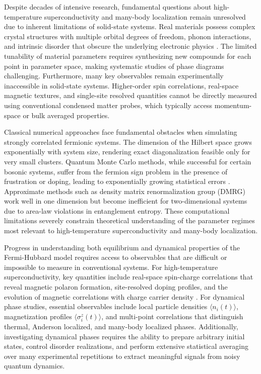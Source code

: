 
Despite decades of intensive research, fundamental questions about high-temperature superconductivity and many-body localization remain unresolved due to inherent limitations of solid-state systems. Real materials possess complex crystal structures with multiple orbital degrees of freedom, phonon interactions, and intrinsic disorder that obscure the underlying electronic physics \cite{koepsell_quantum_2021}. The limited tunability of material parameters requires synthesizing new compounds for each point in parameter space, making systematic studies of phase diagrams challenging. Furthermore, many key observables remain experimentally inaccessible in solid-state systems. Higher-order spin correlations, real-space magnetic textures, and single-site resolved quantities cannot be directly measured using conventional condensed matter probes, which typically access momentum-space or bulk averaged properties.

Classical numerical approaches face fundamental obstacles when simulating strongly correlated fermionic systems. The dimension of the Hilbert space grows exponentially with system size, rendering exact diagonalization feasible only for very small clusters. Quantum Monte Carlo methods, while successful for certain bosonic systems, suffer from the fermion sign problem in the presence of frustration or doping, leading to exponentially growing statistical errors \cite{koepsell_quantum_2021}. Approximate methods such as density matrix renormalization group (DMRG) work well in one dimension but become inefficient for two-dimensional systems due to area-law violations in entanglement entropy. These computational limitations severely constrain theoretical understanding of the parameter regimes most relevant to high-temperature superconductivity and many-body localization.

Progress in understanding both equilibrium and dynamical properties of the Fermi-Hubbard model requires access to observables that are difficult or impossible to measure in conventional systems. For high-temperature superconductivity, key quantities include real-space spin-charge correlations that reveal magnetic polaron formation, site-resolved doping profiles, and the evolution of magnetic correlations with charge carrier density \cite{koepsell_quantum_2021}. For dynamical phase studies, essential observables include local particle densities $\langle n_i(t) \rangle$, magnetization profiles $\langle \sigma^z_i(t) \rangle$, and multi-point correlations that distinguish thermal, Anderson localized, and many-body localized phases. Additionally, investigating dynamical phases requires the ability to prepare arbitrary initial states, control disorder realizations, and perform extensive statistical averaging over many experimental repetitions to extract meaningful signals from noisy quantum dynamics.